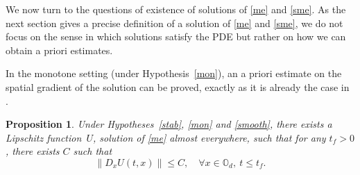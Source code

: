 \documentclass[10pt]{amsart}
\newtheorem{Prop}{Proposition}[section]
\theoremstyle{definition}
\begin{document}
We now turn to the questions of existence of solutions of \eqref{me} and \eqref{sme}. As the next section gives a precise definition of a solution of \eqref{me} and \eqref{sme}, we do not focus on the sense in which solutions satisfy the PDE but rather on how we can obtain a priori estimates.

In the monotone setting (\ie under Hypothesis~\ref{mon}), an a priori estimate on the spatial gradient of the solution can be proved, exactly as it is already the case in \cite{lions2007cours}.
\begin{Prop}\label{existme}
Under Hypotheses~\ref{stab}, \ref{mon} and \ref{smooth}, there exists a Lipschitz function~$U$, solution of \eqref{me} almost everywhere, such that for any $t_f > 0$, there exists $C$ such that%
\begin{equation*}
\|D_x U(t,x)\| \leq C, \quad\forall x \in \mathbb{O}_d,\ t \leq t_f.
\end{equation*}
\end{Prop}
\end{document}
